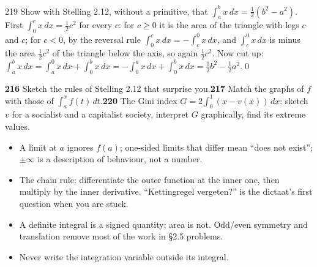 \begin{bookex}{219}
Show with Stelling 2.12, without a primitive, that $\int_a^bx\,dx=\frac12(b^2-a^2)$.
\solution
First $\int_0^cx\,dx=\frac12c^2$ for every $c$: for $c\ge0$ it is the area of the triangle with legs $c$ and $c$; for $c<0$, by the reversal rule $\int_0^cx\,dx=-\int_c^0x\,dx$, and $\int_c^0x\,dx$ is minus the area $\frac12c^2$ of the triangle below the axis, so again $\frac12c^2$. Now cut up: $\int_a^bx\,dx=\int_a^0x\,dx+\int_0^bx\,dx=-\int_0^ax\,dx+\int_0^bx\,dx=\frac12b^2-\frac12a^2$.\qed
\end{bookex}

\begin{trybox}[{216, 217, 220}]
\textbf{216} Sketch the rules of Stelling 2.12 that surprise you.\quad \textbf{217} Match the graphs of $f$ with those of $\int_a^xf(t)\,dt$.\quad \textbf{220} The Gini index $G=2\int_0^1(x-v(x))\,dx$: sketch $v$ for a socialist and a capitalist society, interpret $G$ graphically, find its extreme values.
\end{trybox}

\begin{warn}
\begin{itemize}
\item A limit at $a$ ignores $f(a)$; one-sided limits that differ mean ``does not exist''; $\pm\infty$ is a description of behaviour, not a number.
\item The chain rule: differentiate the outer function at the inner one, then multiply by the inner derivative. ``Kettingregel vergeten?'' is the dictaat's first question when you are stuck.
\item A definite integral is a signed quantity; area is not. Odd/even symmetry and translation remove most of the work in \S2.5 problems.
\item Never write the integration variable outside its integral.
\end{itemize}
\end{warn}
